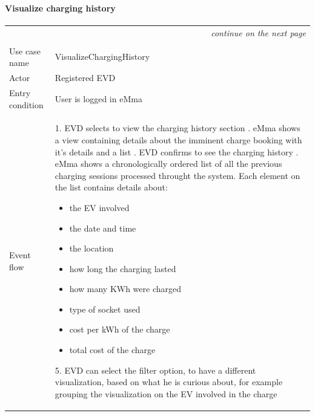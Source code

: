 \paragraph{Visualize charging history}
\begin{center}
    \begin{longtable}{p{4cm} p{11cm}}
    \multicolumn{2}{r}{\itshape{continue on the next page}}\\
    \endfoot 
    \\
    \endlastfoot
    \hline
     Use case name &  VisualizeChargingHistory\\
     \hline
     Actor & Registered EVD \\
     \hline
     Entry condition & User is logged in eMma  \\
     \hline
     Event flow & 
        1. EVD selects to view the charging history section \newline
        2. eMma shows a view containing details about the imminent charge booking with it's details and a list \newline
        3. EVD confirms to see the charging history \newline
        4. eMma shows a chronologically ordered list of all the previous charging sessions processed throught the system. Each element on the list contains details about:
            \begin{adjustwidth}{0.5cm}{}
                \begin{itemize}
                    \item the EV involved %
                    \item the date and time
                    \item the location
                    \item how long the charging lasted
                    \item how many KWh were charged
                    \item type of socket used
                    \item cost per kWh of the charge
                    \item total cost of the charge
                \end{itemize}
            \end{adjustwidth}
        5. EVD can select the filter option, to have a different visualization, based on what he is curious about, for example grouping the visualization on the EV involved in the charge \newline

\end{longtable}
\end{center}
